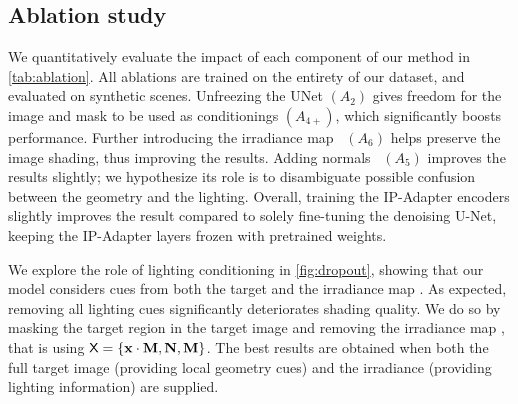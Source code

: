\subsection{Ablation study}

We quantitatively evaluate the impact of each component of our method in \cref{tab:ablation}. All ablations are trained on the entirety of our \datasetname{} dataset, and evaluated on synthetic scenes. Unfreezing the UNet $(A_2)$ gives freedom for the image and mask to be used as conditionings $(A_{4+})$, which significantly boosts performance. Further introducing the irradiance map~\irra{} $(A_6)$ helps preserve the image shading, thus improving the results. Adding normals~\normal{} $(A_5)$ improves the results slightly; we hypothesize its role is to disambiguate possible confusion between the geometry and the lighting. Overall, training the IP-Adapter encoders slightly improves the result compared to solely fine-tuning the denoising U-Net, keeping the IP-Adapter layers frozen with pretrained weights.

We explore the role of lighting conditioning in \cref{fig:dropout}, showing that our model considers cues from both the target \target{} and the irradiance map \irra{}. As expected, removing all lighting cues significantly deteriorates shading quality. We do so by masking the target region \mask{} in the target image \target{} and removing the irradiance map \irra{}, that is using $\textsf{X} = \{\mathbf{x}\cdot\mathbf{M}, \mathbf{N}, \mathbf{M}\}$. The best results are obtained when both the full target image \target{} (providing local geometry cues) and the irradiance (providing lighting information) are supplied. 










    
        



    



